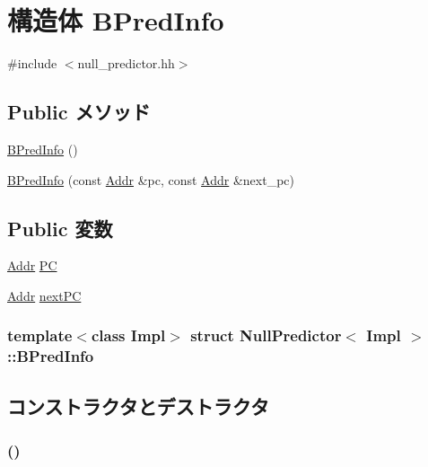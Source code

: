 \hypertarget{structNullPredictor_1_1BPredInfo}{
\section{構造体 BPredInfo}
\label{structNullPredictor_1_1BPredInfo}
}


{\ttfamily \#include $<$null\_\-predictor.hh$>$}\subsection*{Public メソッド}
\begin{DoxyCompactItemize}
\item 
\hyperlink{structNullPredictor_1_1BPredInfo_aafe9024609eb517e0454134197c59a3b}{BPredInfo} ()
\item 
\hyperlink{structNullPredictor_1_1BPredInfo_a65c8237055534423926471b7d0cdb492}{BPredInfo} (const \hyperlink{base_2types_8hh_af1bb03d6a4ee096394a6749f0a169232}{Addr} \&pc, const \hyperlink{base_2types_8hh_af1bb03d6a4ee096394a6749f0a169232}{Addr} \&next\_\-pc)
\end{DoxyCompactItemize}
\subsection*{Public 変数}
\begin{DoxyCompactItemize}
\item 
\hyperlink{base_2types_8hh_af1bb03d6a4ee096394a6749f0a169232}{Addr} \hyperlink{structNullPredictor_1_1BPredInfo_ab4fee9d7e100be71a104b4b714909357}{PC}
\item 
\hyperlink{base_2types_8hh_af1bb03d6a4ee096394a6749f0a169232}{Addr} \hyperlink{structNullPredictor_1_1BPredInfo_a3bda64c96331af0ad914c5873b7074b5}{nextPC}
\end{DoxyCompactItemize}
\subsubsection*{template$<$class Impl$>$ struct NullPredictor$<$ Impl $>$::BPredInfo}



\subsection{コンストラクタとデストラクタ}
\hypertarget{structNullPredictor_1_1BPredInfo_aafe9024609eb517e0454134197c59a3b}{
\subsubsection[{BPredInfo}]{ ()}}
\label{structNullPredictor_1_1BPredInfo_aafe9024609eb517e0454134197c59a3b}



